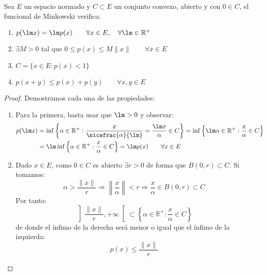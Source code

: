 \begin{prop}\label{prop:f_minkowski}
    Sea $E$ un espacio normado y $C\subset E$ un conjunto convexo, abierto y con $0\in C$, el funcional de Minkowski verifica:
    \begin{enumerate}
        \item $p(\lm x) = \lm p(x)\qquad \forall x\in E, \quad \forall \lm\in \mathbb{R}^+$
        \item $\exists M>0$ tal que $0\leq p(x) \leq M\|x\|\qquad \forall x\in E$
        \item $C = \{x\in E : p(x) < 1\}$
        \item $p(x+y) \leq p(x) + p(y)\qquad \forall x,y\in E$
    \end{enumerate}
    \begin{proof}
        Demostramos cada una de las propiedades:
        \begin{enumerate}
            \item Para la primera, basta usar que $\lm > 0$ y observar:
                \begin{align*}
                    p(\lm x) &= \inf \left\{\alpha\in \mathbb{R}^+ : \dfrac{x}{\nicefrac{\alpha}{\lm}} = \dfrac{\lm x}{\alpha} \in C\right\} = \inf\left\{\lm \alpha\in \mathbb{R}^+ : \dfrac{x}{\alpha}\in C\right\} \\
                             &= \lm\inf\left\{\alpha\in \mathbb{R}^+ : \dfrac{x}{\alpha}\in C\right\} = \lm p(x) \qquad \forall x\in E
                \end{align*}
            \item Dado $x\in E$, como $0\in C$ es abierto $\exists r>0$ de forma que $B(0,r)\subset C$. Si tomamos:
                \begin{equation*}
                    \alpha > \dfrac{\|x\|}{r} \Longrightarrow \left\|\dfrac{x}{\alpha}\right\| < r \Longrightarrow \dfrac{x}{\alpha} \in B(0,r)\subset C
                \end{equation*}
                Por tanto:
                \begin{equation*}
                    \left]\dfrac{\|x\|}{r},+\infty\right[ \subset \left\{\alpha\in \mathbb{R}^+:\frac{x}{\alpha}\in C \right\}
                \end{equation*}
                de donde el ínfimo de la derecha será menor o igual que el ínfimo de la izquierda:
                \begin{equation*}
                    p(x) \leq \dfrac{\|x\|}{r}
                \end{equation*}

\end{enumerate}
\end{proof}
\end{prop}
